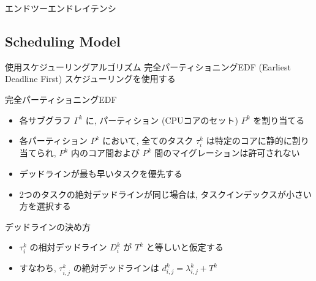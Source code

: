 \begin{frame}{エンドツーエンドレイテンシ}
\end{frame}


\subsection{Scheduling Model}
\label{ssec: scheduling model}

\begin{frame}{使用スケジューリングアルゴリズム}
    完全パーティショニングEDF (Earliest Deadline First) スケジューリングを使用する
    \begin{block}{完全パーティショニングEDF}
        \setlength{\linewidth}{0.98\columnwidth}
        \begin{itemize}
            \item 各サブグラフ $\Gamma^{k}$ に, パーティション (CPUコアのセット) $P^{k}$ を割り当てる
            \item 各パーティション $P^{k}$ において, 全てのタスク $\tau_{i}^{k}$ は特定のコアに静的に割り当てられ, $P^{k}$ 内のコア間および $P^{k}$ 間のマイグレーションは許可されない
            \item デッドラインが最も早いタスクを優先する
            \item 2つのタスクの絶対デッドラインが同じ場合は, タスクインデックスが小さい方を選択する
        \end{itemize}
    \end{block}
\end{frame}

\begin{frame}{デッドラインの決め方}
    \begin{itemize}
        \item $\tau_{i}^{k}$ の相対デッドライン $D_{i}^{k}$ が $T^{k}$ と等しいと仮定する
        \item すなわち, $\tau_{i, j}^{k}$ の絶対デッドラインは $d_{i, j}^{k} = \lambda_{i, j}^{k}+T^{k}$
    \end{itemize}
\end{frame}

